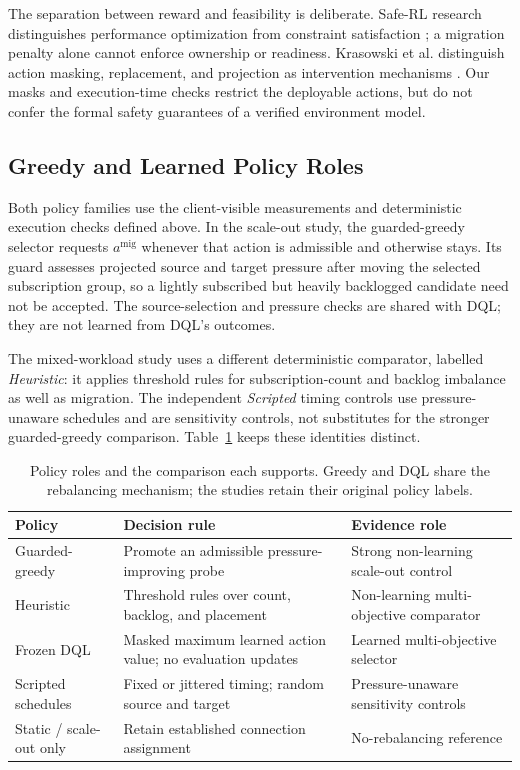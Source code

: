 \documentclass[manuscript]{acmart}
\begin{document}
The separation between reward and feasibility is deliberate. Safe-RL research
distinguishes performance optimization from constraint satisfaction
\cite{Gu2024SafeRL}; a migration penalty alone cannot enforce ownership or
readiness. Krasowski et al. distinguish action masking, replacement, and
projection as intervention mechanisms \cite{Krasowski2023ProvablySafe}.
Our masks and execution-time checks restrict the deployable actions, but do
not confer the formal safety guarantees of a verified environment model.

\subsection{Greedy and Learned Policy Roles}
Both policy families use the client-visible measurements and deterministic
execution checks defined above. In the scale-out study, the guarded-greedy
selector requests $a^{\mathrm{mig}}$ whenever that action is admissible and
otherwise stays. Its guard assesses projected source and target pressure
after moving the selected subscription group, so a lightly subscribed but
heavily backlogged candidate need not be accepted. The source-selection and
pressure checks are shared with DQL; they are not learned from DQL's outcomes.

The mixed-workload study uses a different deterministic comparator, labelled
\emph{Heuristic}: it applies threshold rules for subscription-count and backlog
imbalance as well as migration. The independent \emph{Scripted} timing controls
use pressure-unaware schedules and are sensitivity controls, not substitutes
for the stronger guarded-greedy comparison. Table~\ref{tab:policy-roles}
keeps these identities distinct.

\begin{table}[!htbp]
\centering\small
\caption{Policy roles and the comparison each supports. Greedy and DQL share
the rebalancing mechanism; the studies retain their original policy labels.}
\label{tab:policy-roles}
\begin{tabular}{p{}p{}p{}}
\toprule
Policy & Decision rule & Evidence role\\
\midrule
Guarded-greedy & Promote an admissible pressure-improving probe & Strong non-learning scale-out control\\
Heuristic & Threshold rules over count, backlog, and placement & Non-learning multi-objective comparator\\
Frozen DQL & Masked maximum learned action value; no evaluation updates & Learned multi-objective selector\\
Scripted schedules & Fixed or jittered timing; random source and target & Pressure-unaware sensitivity controls\\
Static / scale-out only & Retain established connection assignment & No-rebalancing reference\\
\bottomrule
\end{tabular}
\end{table}
\end{document}
